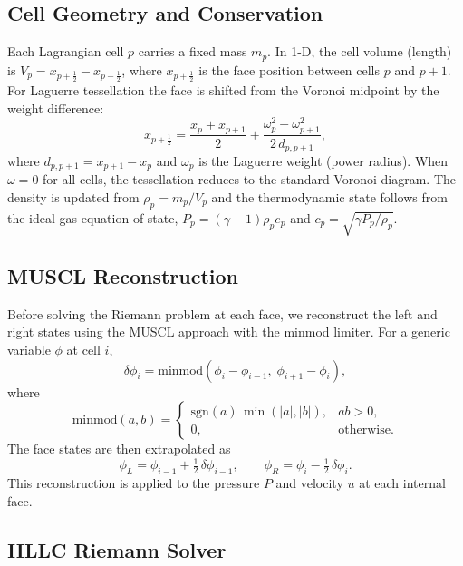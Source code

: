 \documentclass[twocolumn]{aastex63}
\newcommand{\vel}{{u}}
\begin{document}
\subsection{Cell Geometry and Conservation}

Each Lagrangian cell $p$ carries a fixed mass $m_p$.
In 1-D, the cell volume (length) is
$V_p = x_{p+\frac{1}{2}} - x_{p-\frac{1}{2}}$,
where $x_{p+\frac{1}{2}}$ is the face position between cells $p$ and $p\!+\!1$.
For Laguerre tessellation the face is shifted from the Voronoi midpoint by
the weight difference:
\begin{equation}
  x_{p+\frac{1}{2}}
  = \frac{x_p + x_{p+1}}{2}
  + \frac{\omega_p^2 - \omega_{p+1}^2}{2\,d_{p,p+1}},
\end{equation}
where $d_{p,p+1} = x_{p+1}-x_p$ and $\omega_p$ is the Laguerre weight
(power radius).
When $\omega=0$ for all cells, the tessellation reduces to the standard
Voronoi diagram.
The density is updated from $\rho_p = m_p / V_p$ and the
thermodynamic state follows from the ideal-gas equation of state,
$P_p = (\gamma-1)\rho_p e_p$ and
$c_p = \sqrt{\gamma P_p / \rho_p}$.


\subsection{MUSCL Reconstruction}

Before solving the Riemann problem at each face, we reconstruct the
left and right states using the MUSCL approach with the minmod limiter.
For a generic variable $\phi$ at cell $i$,
\begin{equation}
  \delta\phi_i = \mathrm{minmod}(\phi_i - \phi_{i-1},\;\phi_{i+1} - \phi_i),
\end{equation}
where
\begin{equation}
  \mathrm{minmod}(a,b) =
  \begin{cases}
    \mathrm{sgn}(a)\,\min(|a|,|b|), & ab > 0, \\
    0, & \text{otherwise}.
  \end{cases}
\end{equation}
The face states are then extrapolated as
\begin{equation}
  \phi_L = \phi_{i-1} + \tfrac{1}{2}\,\delta\phi_{i-1}, \qquad
  \phi_R = \phi_{i}   - \tfrac{1}{2}\,\delta\phi_{i}.
\end{equation}
This reconstruction is applied to the pressure $P$ and velocity $\vel$
at each internal face.


\subsection{HLLC Riemann Solver}
\end{document}
